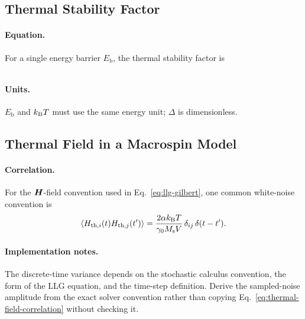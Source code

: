 \subsection{Thermal Stability Factor}

\paragraph{Equation.}
For a single energy barrier $E_{\mathrm{b}}$, the thermal stability factor is

\begin{equation}
    
\end{equation}

\paragraph{Units.}
$E_{\mathrm{b}}$ and $k_{\mathrm{B}} T$ must use the same energy unit; $\Delta$ is dimensionless.

\subsection{Thermal Field in a Macrospin Model}

\paragraph{Correlation.}
For the $\bm{H}$-field convention used in Eq.~\eqref{eq:llg-gilbert}, one common
white-noise convention is
\begin{equation}
    \left\langle H_{\mathrm{th},i}(t)H_{\mathrm{th},j}(t') \right\rangle
    = \frac{2\alpha k_{\mathrm{B}} T}{\gamma_0M_{\mathrm{s}} V}\,
    \delta_{ij}\,\delta(t-t').
    \label{eq:thermal-field-correlation}
\end{equation}

\paragraph{Implementation notes.}
The discrete-time variance depends on the stochastic calculus convention, the form
of the LLG equation, and the time-step definition.  Derive the sampled-noise amplitude
from the exact solver convention rather than copying Eq.~\eqref{eq:thermal-field-correlation}
without checking it.
